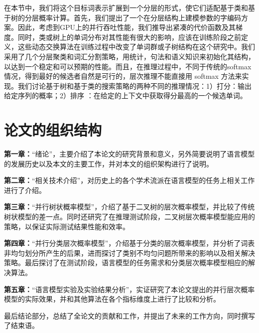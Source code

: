 在本节中，我们将这个目标词表示扩展到一个分层的形式，使它们适配基于类和基于树的分层概率计算。首先，我们提出了一个在分层结构上建模参数的字编码方案。因此，考虑到GPU上的并行吞吐性能，我们推导出紧凑的代价函数及其梯度。同时，类或树上的单词分布对其性能有很大的影响，应该在训练阶段之前定义，这些动态交换算法在训练过程中改变了单词群或子树结构在这个研究中。我们采用了几个分层聚类和词汇分割策略，用统计，句法和语义知识来初始化其结构，以达到一个稳定和可以预期的性能。而且，在推理过程中，不同于传统的softmax情况，得到最好的候选者自然是可行的，层次推理不能直接用 softmax 方法来实现。我们讨论基于树和基于类的搜索策略的两种不同的推理情况：1）打分：输出给定序列的概率；2）排序   ：在给定的上下文中获取得分最高的一个候选单词。
\section{论文的组织结构}
\textbf{第一章：}``绪论''，主要介绍了本论文的研究背景和意义，另外简要说明了语言模型的发展历史以及本文的主要工作，并对本文的组织架构进行了说明。

\textbf{第二章：}``相关技术介绍''，对历史上的各个学术流派在语言模型的任务上相关工作进行了介绍。

\textbf{第三章：}``并行树状概率模型''，介绍了基于二叉树的层次概率模型，并比较了传统树状模型的差一点。同时还研究了在推理测试阶段，二叉树层次概率模型能应用的策略，以保证实际测试结果性能和效率。


\textbf{第四章：}``并行分类层次概率模型''，介绍基于分类的层次概率模型，并分析了词表非均匀划分所产生的后果，进而探讨了类别不均匀问题所带来的影响以及相关解决策略。最后探讨了在测试阶段，语言模型的任务需求和分类层次概率模型相应的解决算法。

\textbf{第五章：}``语言模型实验及实验结果分析''，实证研究了本论文提出的并行层次概率模型的实际效果，并和其他算法在各个指标维度上进行了比较和分析。

最后结论部分，总结了全论文的贡献和工作，并提出了未来的工作方向，同时撰写了结束语。



